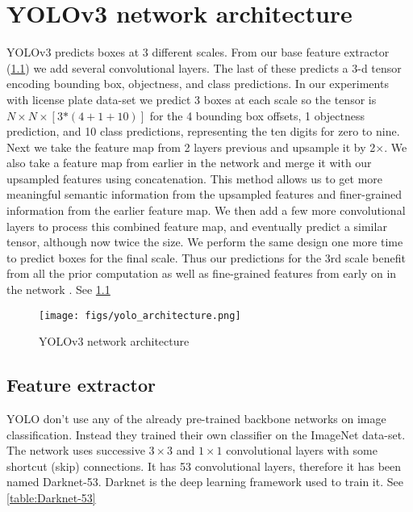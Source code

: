 \chapter{YOLOv3 network architecture}
YOLOv3 predicts boxes at 3 different scales. From our base feature extractor (\cref{feature_extractor}) we add several convolutional layers. The last
of these predicts a 3-d tensor encoding bounding box, objectness, and class predictions. In our experiments with license plate data-set we predict 3 boxes at each scale so the tensor is $N \times N \times [3 \text{*} (4 + 1 + 10)]$ for the 4 bounding box offsets, 1 objectness prediction, and 10 class predictions, representing the ten digits for zero to nine. Next we take the feature map from 2 layers previous and
upsample it by 2$\times$. We also take a feature map from earlier
in the network and merge it with our upsampled features
using concatenation. This method allows us to get more
meaningful semantic information from the upsampled features and finer-grained information from the earlier feature
map. We then add a few more convolutional layers to process this combined feature map, and eventually predict a
similar tensor, although now twice the size. We perform the same design one more time to predict
boxes for the final scale. Thus our predictions for the 3rd
scale benefit from all the prior computation as well as fine-grained features from early on in the network \cite{YOLOv3}. See \cref{fig:arch}

\begin{figure}[!htpb]
  \centering
  \texttt{[image: figs/yolo\_architecture.png]}
  \caption{YOLOv3 network architecture}\label{fig:arch}
\end{figure}

\section{Feature extractor}\label{feature_extractor}
YOLO don't use any of the already pre-trained backbone networks on image classification. Instead they trained their own classifier on the ImageNet data-set. The network uses successive $3 \times 3$ and $1 \times 1$ convolutional layers with some shortcut (skip) connections. It has 53 convolutional layers, therefore it has been named Darknet-53. Darknet is the deep learning framework used to train it. See \cref{table:Darknet-53}

